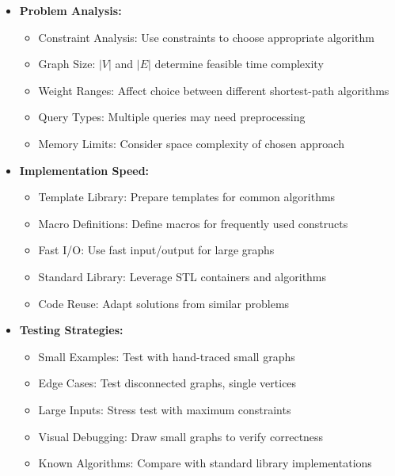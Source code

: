 \documentclass[a4paper,10pt]{book}
\begin{document}
\begin{itemize}[leftmargin=*]
    \item \textbf{Problem Analysis:}
    \begin{itemize}
        \item Constraint Analysis: Use constraints to choose appropriate algorithm
        \item Graph Size: $|V|$ and $|E|$ determine feasible time complexity
        \item Weight Ranges: Affect choice between different shortest-path algorithms
        \item Query Types: Multiple queries may need preprocessing
        \item Memory Limits: Consider space complexity of chosen approach
    \end{itemize}

    \item \textbf{Implementation Speed:}
    \begin{itemize}
        \item Template Library: Prepare templates for common algorithms
        \item Macro Definitions: Define macros for frequently used constructs
        \item Fast I/O: Use fast input/output for large graphs
        \item Standard Library: Leverage STL containers and algorithms
        \item Code Reuse: Adapt solutions from similar problems
    \end{itemize}

    \item \textbf{Testing Strategies:}
    \begin{itemize}
        \item Small Examples: Test with hand-traced small graphs
        \item Edge Cases: Test disconnected graphs, single vertices
        \item Large Inputs: Stress test with maximum constraints
        \item Visual Debugging: Draw small graphs to verify correctness
        \item Known Algorithms: Compare with standard library implementations
    \end{itemize}
\end{itemize}
\end{document}
